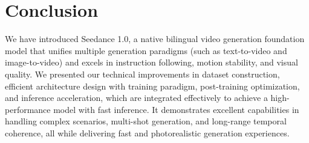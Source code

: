 \label{Conclusion}


\section{Conclusion} 

We have introduced Seedance 1.0, a native bilingual video generation foundation model that unifies multiple generation paradigms (such as text-to-video and image-to-video) and excels in instruction following, motion stability, and visual quality. We presented our technical improvements in dataset construction, efficient architecture design with training paradigm, post-training optimization, and inference acceleration, which are integrated effectively to achieve a high-performance model with fast inference. It demonstrates excellent capabilities in handling complex scenarios, multi-shot generation, and long-range temporal coherence, all while delivering fast and photorealistic generation experiences.
